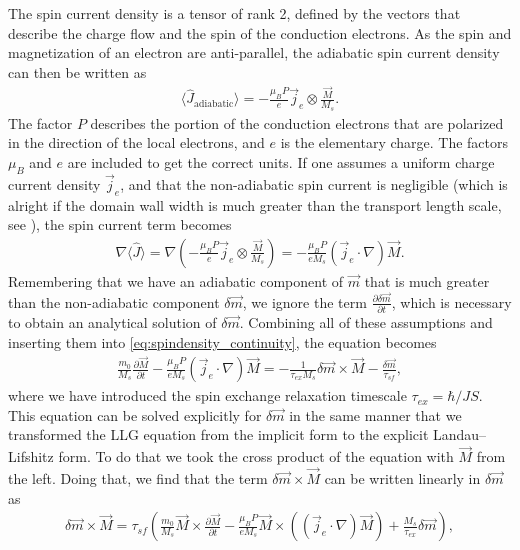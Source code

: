 \documentclass[12pt, a4paper]{article}		%
\numberwithin{equation}{section}
\begin{document}
The spin current density is a tensor of rank 2, defined by the vectors that describe the charge flow and the spin of the conduction electrons. As the spin and magnetization of an electron are anti-parallel, the adiabatic spin current density can then be written as
\begin{align}
\langle \hat{J}_{\textrm{adiabatic}} \rangle = -\frac{\mu_B P}{e} \vec{j}_e \otimes \frac{\vec{M}}{M_s}.
\end{align}
The factor $P$ describes the portion of the conduction electrons that are polarized in the direction of the local electrons, and $e$ is the elementary charge. The factors $\mu_B$ and $e$ are included to get the correct units. If one assumes a uniform charge current density $\vec{j}_e$, and that the non-adiabatic spin current is negligible (which is alright if the domain wall width is much greater than the transport length scale, see \cite{ZhangLi-04}), the spin current term becomes
\begin{align}
\nabla \langle \hat{J} \rangle = \nabla (-\frac{\mu_B P}{e} \vec{j}_e \otimes \frac{\vec{M}}{M_s}) = -\frac{\mu_B P}{e M_s} (\vec{j}_e \cdot \nabla) \vec{M}.
\end{align}
Remembering that we have an adiabatic component of $\vec{m}$ that is much greater than the non-adiabatic component $\delta\vec{m}$, we ignore the term $\frac{\partial \delta\vec{m}}{\partial t}$, which is necessary to obtain an analytical solution of $\delta \vec{m}$. Combining all of these assumptions and inserting them into \eqref{eq:spindensity_continuity}, the equation becomes 
\begin{align}
\label{eq:dm_implicit}
\frac{m_0}{M_s}\frac{\partial \vec{M}}{\partial t} - \frac{\mu_B P}{e M_s} (\vec{j}_e \cdot \nabla) \vec{M} = -\frac{1}{\tau_{ex} M_s} \delta\vec{m} \times \vec{M} - \frac{\delta\vec{m}}{\tau_{sf}},
\end{align}
where we have introduced the spin exchange relaxation timescale $\tau_{ex} = \hbar/JS$. This equation can be solved explicitly for $\delta\vec{m}$ in the same manner that we transformed the LLG equation from the implicit form to the explicit Landau--Lifshitz form. To do that we took the cross product of the equation with $\vec{M}$ from the left. Doing that, we find that the term $\delta\vec{m}\times\vec{M}$ can be written linearly in $\delta\vec{m}$ as
\begin{align}
\delta\vec{m} \times \vec{M} = \tau_{sf} (\frac{m_0}{M_s} \vec{M} \times \frac{\partial \vec{M}}{\partial t} - \frac{\mu_B P}{e M_s} \vec{M}\times((\vec{j}_e\cdot\nabla)\vec{M}) + \frac{M_s}{\tau_{ex}} \delta\vec{m}),
\end{align}
\end{document}
